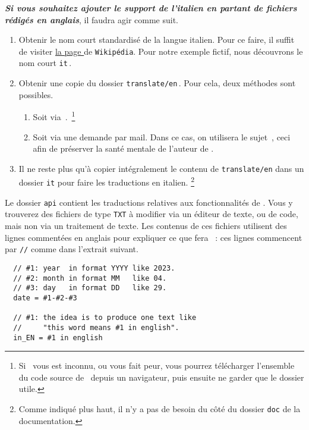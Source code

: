 \documentclass[10pt, a4paper]{../main/main}
\begin{document}
\textbf{\emph{Si vous souhaitez ajouter le support de l'italien en partant de fichiers rédigés en anglais}}, il faudra agir comme suit.
%
\begin{enumerate}
	\item Obtenir le nom court standardisé de la langue italien. 
	Pour ce faire, il suffit de visiter
	\href{https://en.wikipedia.org/wiki/IETF_language_tag#List_of_common_primary_language_subtags}%
	     {la page }
	de \texttt{Wikipédia}.
	Pour notre exemple fictif, nous découvrons le nom court \verb#it#\,.

	\item Obtenir une copie du dossier \verb#translate/en#\,.
	Pour cela, deux méthodes sont possibles.
	\begin{enumerate}
		\item Soit via \thisrepo\,.\,%
		\footnote{
			Si \git\ vous est inconnu, ou vous fait peur, vous pourrez télécharger l'ensemble du code source de \thisproj\ depuis un navigateur, puis ensuite ne garder que le dossier utile.
		}

		\item Soit via une demande par mail.
		Dans ce cas, on utilisera le sujet \,, ceci afin de préserver la santé mentale de l'auteur de \thisproj.
	\end{enumerate}


	\item Il ne reste plus qu'à copier intégralement le contenu de \verb#translate/en# dans un dossier \verb#it# pour faire les traductions en italien.%
	\footnote{
		Comme indiqué plus haut, il n'y a pas de besoin du côté du dossier \texttt{doc} de la documentation.
	}
\end{enumerate}


\begin{tdocimp}
	Le dossier \verb#api# contient les traductions relatives aux fonctionnalités de \thisproj.
	Vous y trouverez des fichiers de type \verb#TXT# à modifier via un éditeur de texte, ou de code, mais non via un traitement de texte.
	Les contenus de ces fichiers utilisent des lignes commentées en anglais pour expliquer ce que fera \thisproj\ : ces lignes commencent par \verb#//# comme dans l'extrait suivant.
	
	\begin{verbatim}
  // #1: year  in format YYYY like 2023.
  // #2: month in format MM   like 04.
  // #3: day   in format DD   like 29.
  date = #1-#2-#3

  // #1: the idea is to produce one text like
  //     "this word means #1 in english".
  in_EN = #1 in english\end{verbatim}
\end{tdocimp}
\end{document}
